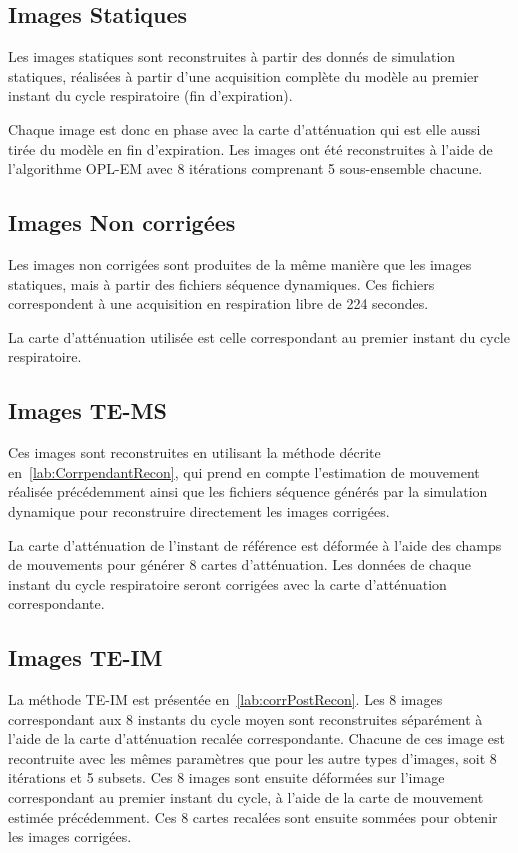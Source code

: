 \subsection{Images Statiques}

Les images statiques sont reconstruites à partir des donnés de simulation statiques, réalisées à partir d'une acquisition complète du modèle au premier instant du cycle respiratoire (fin d'expiration).

Chaque image est donc en phase avec la carte d'atténuation qui est elle aussi tirée du modèle en fin d'expiration. Les images ont été reconstruites à l'aide de l'algorithme OPL-EM avec 8 itérations comprenant 5 sous-ensemble chacune.

\subsection{Images Non corrigées}

Les images non corrigées sont produites de la même manière que les images statiques, mais à partir des fichiers séquence dynamiques. Ces fichiers correspondent à une acquisition en respiration libre de 224 secondes. 

La carte d'atténuation utilisée est celle correspondant au premier instant du cycle respiratoire.

\subsection{Images TE-MS}

Ces images sont reconstruites en utilisant la méthode décrite en~\ref{lab:CorrpendantRecon}, qui prend en compte l'estimation de mouvement réalisée précédemment ainsi que les fichiers séquence générés par la simulation dynamique pour reconstruire directement les images corrigées. 

La carte d'atténuation de l'instant de référence est déformée à l'aide des champs de mouvements pour générer 8 cartes d'atténuation. Les données de chaque instant du cycle respiratoire seront corrigées avec la carte d'atténuation correspondante.

\subsection{Images TE-IM}

La méthode TE-IM est présentée en~\ref{lab:corrPostRecon}. Les 8 images correspondant aux 8 instants du cycle moyen sont reconstruites séparément à l'aide de la carte d'atténuation recalée correspondante. Chacune de ces image est recontruite avec les mêmes paramètres que pour les autre types d'images, soit 8 itérations et 5 subsets. Ces 8 images sont ensuite déformées sur l'image correspondant au premier instant du cycle, à l'aide de la carte de mouvement estimée précédemment. Ces 8 cartes recalées sont ensuite sommées pour obtenir les images corrigées.

